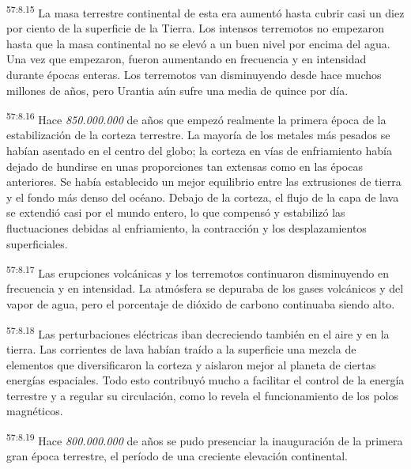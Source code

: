 \par
\textsuperscript{57:8.15} La masa terrestre continental de esta era aumentó hasta cubrir casi un diez por ciento de la superficie de la Tierra. Los intensos terremotos no empezaron hasta que la masa continental no se elevó a un buen nivel por encima del agua. Una vez que empezaron, fueron aumentando en frecuencia y en intensidad durante épocas enteras. Los terremotos van disminuyendo desde hace muchos millones de años, pero Urantia aún sufre una media de quince por día.

\par
\textsuperscript{57:8.16} Hace \textit{850.000.000} de años que empezó realmente la primera época de la estabilización de la corteza terrestre. La mayoría de los metales más pesados se habían asentado en el centro del globo; la corteza en vías de enfriamiento había dejado de hundirse en unas proporciones tan extensas como en las épocas anteriores. Se había establecido un mejor equilibrio entre las extrusiones de tierra y el fondo más denso del océano. Debajo de la corteza, el flujo de la capa de lava se extendió casi por el mundo entero, lo que compensó y estabilizó las fluctuaciones debidas al enfriamiento, la contracción y los desplazamientos superficiales.

\par
\textsuperscript{57:8.17} Las erupciones volcánicas y los terremotos continuaron disminuyendo en frecuencia y en intensidad. La atmósfera se depuraba de los gases volcánicos y del vapor de agua, pero el porcentaje de dióxido de carbono continuaba siendo alto.

\par
\textsuperscript{57:8.18} Las perturbaciones eléctricas iban decreciendo también en el aire y en la tierra. Las corrientes de lava habían traído a la superficie una mezcla de elementos que diversificaron la corteza y aislaron mejor al planeta de ciertas energías espaciales. Todo esto contribuyó mucho a facilitar el control de la energía terrestre y a regular su circulación, como lo revela el funcionamiento de los polos magnéticos.

\par
\textsuperscript{57:8.19} Hace \textit{800.000.000} de años se pudo presenciar la inauguración de la primera gran época terrestre, el período de una creciente elevación continental.

